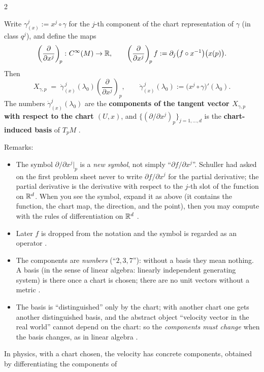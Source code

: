 \begin{paracol}{2}
\begin{definition}\label{def:ts-basis}
Write $\gamma^j_{(x)}:=x^j\circ\gamma$ for the $j$-th component of the chart representation of $\gamma$ (in class $q^j$),
and define the maps
\[
  \left(\frac{\partial}{\partial x^j}\right)_{\!p}\colon C^\infty(M)\to\mathbb{R},\qquad
  \left(\frac{\partial}{\partial x^j}\right)_{\!p}f:=\partial_j\bigl(f\circ x^{-1}\bigr)\bigl(x(p)\bigr).
\]
Then
\[
  X_{\gamma,p}\;=\;\dot\gamma^{\,j}_{(x)}(\lambda_0)\left(\frac{\partial}{\partial x^j}\right)_{\!p},
  \qquad \dot\gamma^{\,j}_{(x)}(\lambda_0):=\bigl(x^j\circ\gamma\bigr)'(\lambda_0).
\]
The numbers $\dot\gamma^j_{(x)}(\lambda_0)$ are the \textbf{components of the tangent vector $X_{\gamma,p}$ with respect to the chart
$(U,x)$}, and $\{(\partial/\partial x^j)_p\}_{j=1,\dots,d}$ is the \textbf{chart-induced basis} of $T_pM$
.
\end{definition}
Remarks:
\begin{itemize}
  \item The symbol $\partial/\partial x^j|_p$ is a \emph{new symbol}, not simply ``$\partial f/\partial x^j$''. Schuller had asked
        on the first problem sheet never to write $\partial f/\partial x^j$ for the partial derivative; the partial derivative
        is the derivative with respect to the $j$-th slot of the function on $\mathbb{R}^d$. When you see the symbol, expand
        it as above (it contains the function, the chart map, the direction, and the point), then you may compute with the
        rules of differentiation on $\mathbb{R}^d$ .
  \item Later $f$ is dropped from the notation and the symbol is regarded as an operator .
  \item The components are \emph{numbers} (``$2,3,7$''): without a basis they mean nothing. A basis (in the sense of linear
        algebra: linearly independent generating system) is there once a chart is chosen; there are no unit vectors
        without a metric .
  \item The basis is ``distinguished'' only by the chart; with another chart one gets another distinguished basis, and the
        abstract object ``velocity vector in the real world'' cannot depend on the chart: so the \emph{components must change}
        when the basis changes, as in linear algebra .
\end{itemize}
In physics, with a chart chosen, the velocity has concrete components, obtained by differentiating the components of

\end{paracol}
